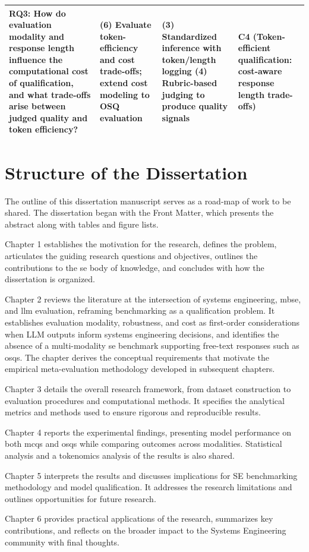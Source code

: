 \begin{table}[htbp]
\begin{tabularx}{\linewidth}{p{3.2cm} Y Y p{3.3cm}}
\textbf{RQ3:} How do evaluation modality and response length influence the computational cost of qualification, and what trade-offs arise between judged quality and token efficiency? &
(6) Evaluate token-efficiency and cost trade-offs; extend cost modeling to OSQ evaluation &
(3) Standardized inference with token/length logging\newline
(4) Rubric-based judging to produce quality signals &
C4 (Token-efficient qualification: cost-aware response length trade-offs) \\
\bottomrule
\end{tabularx}
\end{table}






\section{Structure of the Dissertation}\label{sec:structure_dissertation}
The outline of this dissertation manuscript serves as a road-map of work to be shared. The dissertation began with the Front Matter, which presents the abstract along with tables and figure lists.

Chapter 1 establishes the motivation for the research, defines the problem, articulates the guiding research questions and objectives, outlines the contributions to the \ac{se} body of knowledge, and concludes with how the dissertation is organized.

Chapter 2 reviews the literature at the intersection of systems engineering, \ac{mbse}, and \ac{llm} evaluation, reframing benchmarking as a qualification problem. It establishes evaluation modality, robustness, and cost as first-order considerations when LLM outputs inform systems engineering decisions, and identifies the absence of a multi-modality \ac{se} benchmark supporting free-text responses such as \acp{osq}. The chapter derives the conceptual requirements that motivate the empirical meta-evaluation methodology developed in subsequent chapters.

Chapter 3 details the overall research framework, from dataset construction to evaluation procedures and computational methods. It specifies the analytical metrics and methods used to ensure rigorous and reproducible results.

Chapter 4 reports the experimental findings, presenting model performance on both \acp{mcq} and \acp{osq} while comparing outcomes across modalities. Statistical analysis and a tokenomics analysis of the results is also shared.

Chapter 5 interprets the results and discusses implications for SE benchmarking methodology and model qualification. It addresses the research limitations and outlines opportunities for future research.

Chapter 6 provides practical applications of the research, summarizes key contributions, and reflects on the broader impact to the Systems Engineering community with final thoughts.
